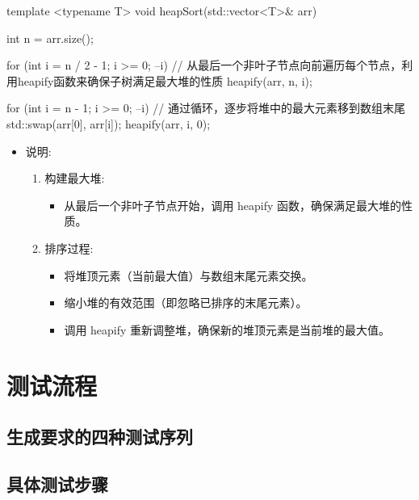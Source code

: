 \documentclass{article}
\begin{document}
    template <typename T>
    void heapSort(std::vector<T>\& arr)
    {
        int n = arr.size();

        for (int i = n / 2 - 1; i >= 0; --i)    // 从最后一个非叶子节点向前遍历每个节点，利用heapify函数来确保子树满足最大堆的性质
            heapify(arr, n, i);

        for (int i = n - 1; i >= 0; --i)         // 通过循环，逐步将堆中的最大元素移到数组末尾
        {
            std::swap(arr[0], arr[i]);
            heapify(arr, i, 0);
        }
    }

    \begin{itemize}
        \item 说明:
        \begin{enumerate}
            \item 构建最大堆:
            \begin{itemize}
                \item 从最后一个非叶子节点开始，调用 heapify 函数，确保满足最大堆的性质。
            \end{itemize}
            \item 排序过程:
            \begin{itemize}
                \item 将堆顶元素（当前最大值）与数组末尾元素交换。
                \item 缩小堆的有效范围（即忽略已排序的末尾元素）。
                \item 调用 heapify 重新调整堆，确保新的堆顶元素是当前堆的最大值。
            \end{itemize}
        \end{enumerate}
    \end{itemize}

    \section{测试流程}

    \subsection{生成要求的四种测试序列}

    \subsection{具体测试步骤}
\end{document}
